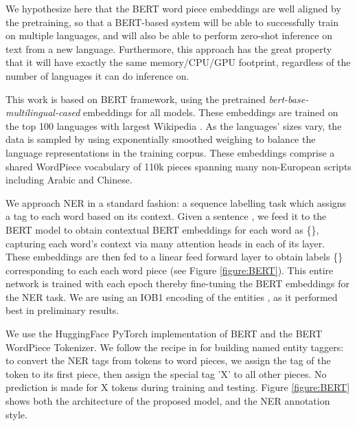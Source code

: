 \documentclass[letterpaper]{article} \usepackage{aaai20}  \usepackage{times}  \usepackage{helvet} \usepackage{courier}  \usepackage[hyphens]{url}  \usepackage{graphicx} \urlstyle{rm} \def\UrlFont{\rm}  \usepackage{graphicx}  \frenchspacing  \setlength{\pdfpagewidth}{8.5in}  \setlength{\pdfpageheight}{11in}  \usepackage{amsmath}
\begin{document}
We hypothesize here that the BERT word piece embeddings are well
aligned by the pretraining, so that a BERT-based system will be able to
successfully train on multiple languages, and will also be able to
perform zero-shot inference on text from a new language. Furthermore,
this approach has the great property that it will have exactly the
same memory/CPU/GPU footprint, regardless of the number of languages
it can do inference on.

This work is based on \cite{BERT18} BERT framework, using the
pretrained \textit{bert-base-multilingual-cased} embeddings for all
models. These embeddings are trained on the top 100 languages with largest
Wikipedia \cite{google-research18:_tensor_bert}. As the languages'
sizes vary, the data is sampled by using exponentially smoothed
weighing to balance the language representations in the training
corpus. These embeddings comprise a shared WordPiece vocabulary
of 110k pieces spanning many non-European scripts including Arabic and Chinese.


We approach NER in a standard fashion: a sequence labelling task which
assigns a tag to each word based on its context. Given a sentence
, we feed it to the BERT model
to obtain contextual BERT embeddings for each word as
\{\}, capturing each word's context via many
attention heads in each of its layer. These embeddings are then fed to
a linear feed forward layer to obtain labels
\{\} corresponding to each each word piece (see Figure
\ref{figure:BERT}). This entire network is trained with each epoch
thereby fine-tuning the BERT embeddings for the NER task. We are using
an IOB1 encoding of the entities \cite{sang99representing}, as it
performed best in preliminary results.


We use the HuggingFace PyTorch implementation of BERT
\cite{huggingface-github19} and the BERT WordPiece Tokenizer. We
follow the recipe in \cite{BERT18} for building named entity taggers:
to convert the NER tags from tokens to word pieces, we assign the tag
of the token to its first piece, then assign the special tag 'X' to
all other pieces. No prediction is made for \textquotedbl
X\textquotedbl{} tokens during training and testing. Figure
\ref{figure:BERT} shows both the architecture of the proposed model,
and the NER annotation style.
 \makeatletter
\setlength{\@fptop}{0pt}
\makeatother
\end{document}
